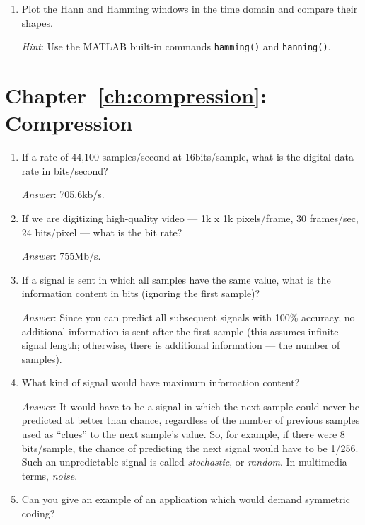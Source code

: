\begin{enumerate}
\item Plot the Hann and Hamming windows in the time domain and compare
  their shapes.\label{it:ch7ex2}

  \textit{Hint}: Use the MATLAB built-in commands
  \texttt{hamming()} and \texttt{hanning()}.

\end{enumerate}

\section{Chapter~\ref{ch:compression}: Compression}
\label{sc:ch8ex}

\begin{enumerate}

\item If a rate of 44,100 samples/second at 16bits/sample, what is
  the digital data rate in bits/second?\label{it:ch8ex1}

  \textit{Answer}: 705.6kb/s.

\item If we are digitizing high-quality video --- 1k x 1k
  pixels/frame, 30 frames/sec, 24 bits/pixel --- what is the bit
  rate?\label{it:ch8ex2}

  \textit{Answer}: 755Mb/s.

\item If a signal is sent in which all samples have the same value,
  what is the information content in bits (ignoring the first
  sample)?\label{it:ch8ex3}

  \textit{Answer}: Since you can predict all subsequent signals
  with 100\% accuracy, no additional information is sent after the first
  sample (this assumes infinite signal length; otherwise, there is
  additional information --- the number of samples).

\item What kind of signal would have maximum information
  content?\label{it:ch8ex4}

  \textit{Answer}: It would have to be a signal in which the
  next sample could never be predicted at better than chance, regardless
  of the number of previous samples used as ``clues'' to the next
  sample's value. So, for example, if there were 8 bits/sample, the
  chance of predicting the next signal would have to be 1/256. Such an
  unpredictable signal is called \emph{stochastic}, or \emph{random}. In
  multimedia terms, \emph{noise}.

\item Can you give an example of an application which would demand
  symmetric coding?\label{it:ch8ex5}


\end{enumerate}
